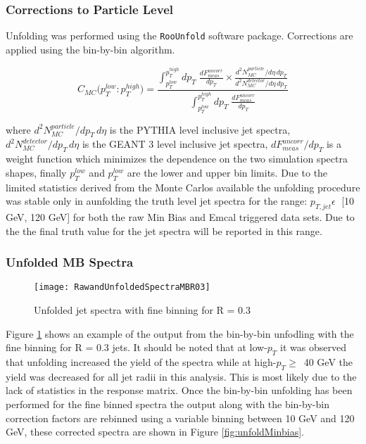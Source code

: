 \subsubsection{Corrections to Particle Level}

Unfolding was performed using the \verb+RooUnfold+\cite{Adye:2011gm} software package.  Corrections are applied using the bin-by-bin\cite{Cowan:2002in} algorithm. 

\begin{equation}
C_{MC} \big( p_{T}^{low} : p_{T}^{high} \big) =  \frac{  \int^{p_{T}^{high}}_{p_{T}^{low}} dp_{T} \; \frac{dF^{uncorr}_{meas}}{dp_{T}} \times \frac{d^{2}N^{particle}_{MC}/d\eta \, dp_{T}}{d^{2}N^{detector}_{MC}/d\eta \, dp_{T}}  } { \int^{p_{T}^{high}}_{p_{T}^{low}} dp_{T} \; \frac{dF^{uncorr}_{meas}}{dp_{T}} }
\label{eq:binbybin}
\end{equation}

\noindent
where $d^{2}N^{particle}_{MC}/dp_{T} \, d\eta$ is the PYTHIA level inclusive jet spectra, $d^{2}N^{detector}_{MC}/dp_{T} \, d\eta$ is the GEANT 3 level inclusive jet spectra, $dF^{uncorr}_{meas} / dp_{T}$ is a weight function which minimizes the dependence on the two simulation spectra shapes, finally $p_{T}^{low}$ and $p_{T}^{low}$ are the lower and upper bin limits.  Due to the limited statistics derived from the Monte Carlos available the unfolding procedure was stable only in aunfolding the truth level jet spectra for the range: $p_{T,jet} \epsilon \;$ [10 GeV, 120 GeV] for both the raw Min Bias and Emcal triggered data sets.  Due to the  the final truth value for the jet spectra will be reported in this range.



\subsubsection{Unfolded MB Spectra}

\begin{figure}[h]
\texttt{[image: RawandUnfoldedSpectraMBR03]}
\centering
\caption{Unfolded jet spectra with fine binning for R = 0.3}
\label{fig:Unfoldfine}
\end{figure}

Figure \ref{fig:Unfoldfine} shows an example of the output from the bin-by-bin unfodling with the fine binning for R = 0.3 jets.  It should be noted that at low-$p_{T}$ it was observed that unfolding increased the yield of the spectra while at high-$p_{T} \geq \,$ 40 GeV the yield was decreased for all jet radii in this analysis.  This is most likely due to the lack of statistics in the response matrix.  Once the bin-by-bin unfolding has been performed for the fine binned spectra the output along with the bin-by-bin correction factors are rebinned using a variable binning between 10 GeV and 120 GeV, these corrected spectra are shown in Figure \ref{fig:unfoldMinbias}.


